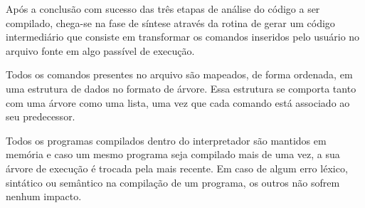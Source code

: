 \documentclass[
12pt,				%
a4paper,			%
english,			%
french,				%
spanish,			%
brazil,				%
article
]{abntex2}
\begin{document}
Após a conclusão com sucesso das três etapas de análise do código a ser compilado, chega-se na fase de síntese através da rotina de gerar um código intermediário que consiste em transformar os comandos inseridos pelo usuário no arquivo fonte em algo passível de execução.

Todos os comandos presentes no arquivo são mapeados, de forma ordenada, em uma estrutura de dados no formato de árvore. Essa estrutura se comporta tanto com uma árvore como uma lista, uma vez que cada comando está associado ao seu predecessor.

Todos os programas compilados dentro do interpretador são mantidos em memória e caso um mesmo programa seja compilado mais de uma vez, a sua árvore de execução é trocada pela mais recente. Em caso de algum erro léxico, sintático ou semântico na compilação de um programa, os outros não sofrem nenhum impacto.
\end{document}
